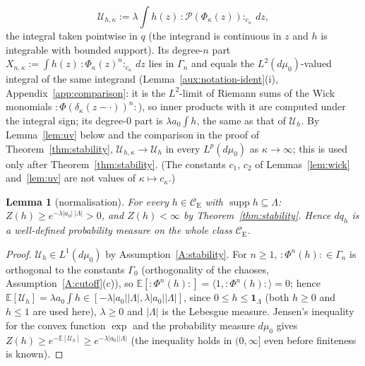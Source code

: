 \documentclass[11pt,a4paper]{article}
\theoremstyle{plain}
\newtheorem{lemma}[theorem]{Lemma}
\theoremstyle{definition}
\theoremstyle{plain}
\theoremstyle{definition}
\newcommand{\E}{\mathbb{E}}
\newcommand{\CE}{\mathcal{C}_{\mathrm E}}
\newcommand{\ip}[2]{\langle #1,#2\rangle}
\DeclareMathOperator{\supp}{supp}
\begin{document}
\[
 \mathcal U_{h,\kappa}:=\lambda\int h(z)\,{:}\mathscr P(\Phi_\kappa(z)){:}_{c_\kappa}\,dz ,
\]
the integral taken pointwise in $q$ (the integrand is continuous in $z$ and $h$ is
integrable with bounded support).  Its degree-$n$ part
$X_{n,\kappa}:=\int h(z)\,{:}\Phi_\kappa(z)^n{:}_{c_\kappa}\,dz$ lies in $\Gamma_n$ and equals the
$L^2(d\mu_0)$-valued integral of the same integrand (Lemma~\ref{aux:notation-ident}(i),
Appendix~\ref{app:comparison}: it is the $L^2$-limit of Riemann sums of the Wick monomials
${:}\Phi(\delta_\kappa(z-\cdot))^n{:}$), so inner products with it are computed under the
integral sign; its degree-$0$ part is $\lambda a_0\int h$, the same as that of
$\mathcal U_h$.  By Lemma~\ref{lem:uv} below and the comparison in the proof of
Theorem~\ref{thm:stability}, $\mathcal U_{h,\kappa}\to\mathcal U_h$ in every $L^p(d\mu_0)$
as $\kappa\to\infty$; this is used only after Theorem~\ref{thm:stability}.  (The
constants $c_1$, $c_2$ of Lemmas~\ref{lem:wick} and~\ref{lem:uv} are not values of
$\kappa\mapsto c_\kappa$.)

\begin{lemma}[normalisation]\label{lem:Z}
For every $h\in\CE$ with $\supp h\subseteq\Lambda$:
$Z(h)\ge e^{-\lambda|a_0|\,|\Lambda|}>0$, and $Z(h)<\infty$ by
Theorem~\ref{thm:stability}. Hence $dq_h$ is a well-defined probability measure on the
whole class $\CE$.
\end{lemma}

\begin{proof}
$\mathcal U_h\in L^1(d\mu_0)$ by Assumption~\ref{A:stability}.  For $n\ge1$,
${:}\Phi^n(h){:}\in\Gamma_n$ is orthogonal to the constants $\Gamma_0$ (orthogonality of
the chaoses, Assumption~\ref{A:cutoff}(c)), so $\E[{:}\Phi^n(h){:}]=\ip1{{:}\Phi^n(h){:}}=0$;
hence $\E[\mathcal U_h]=\lambda a_0\int h\in[-\lambda|a_0||\Lambda|,\lambda|a_0||\Lambda|]$,
since $0\le h\le\mathbf 1_\Lambda$ (both $h\ge0$ and $h\le1$ are used here), $\lambda\ge0$
and $|\Lambda|$ is the Lebesgue measure.  Jensen's inequality for the convex function
$\exp$ and the probability measure $d\mu_0$ gives
$Z(h)\ge e^{-\E[\mathcal U_h]}\ge e^{-\lambda|a_0||\Lambda|}$ (the inequality holds in
$(0,\infty]$ even before finiteness is known).
\end{proof}
\end{document}
